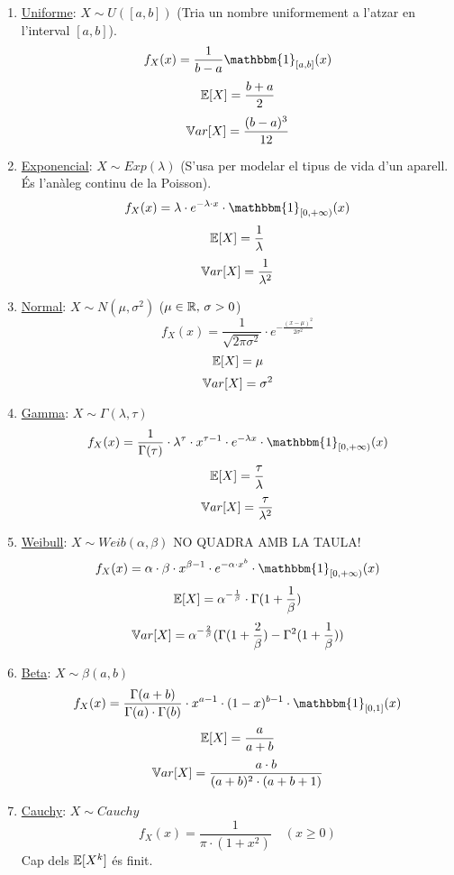 \begin{enumerate}
    \item \underline{Uniforme}: $X \sim U([a,b])$ \quad (Tria un nombre uniformement a l'atzar en l'interval $[a,b]$). \\
    \[
      f_{X}(x)=\frac{1}{b-a}\mathbbm{1}_{[a,b]}(x)
    \]
    \[
      \mathbb{E}[X]=\frac{b+a}{2}
    \]
    \[
      \mathbb{V} ar[X]=\frac{(b-a)^{3}}{12}
    \]
    \item \underline{Exponencial}: $X\sim Exp(\lambda)$ \quad (S'usa per modelar el tipus de vida d'un aparell. És l'anàleg continu de la Poisson).
    \[
      f_{X}(x)=\lambda\cdot e^{-\lambda\cdot x}\cdot \mathbbm{1}_{[0,+\infty)}(x)
    \]
    \[
      \mathbb{E}[X]=\frac{1}{\lambda}
    \]
    \[
      \mathbb{V} ar[X]=\frac{1}{\lambda^{2}}
    \]
    \item \underline{Normal}: $X\sim N(\mu, \sigma^{2})$ \quad ($\mu \in \mathbb{R}, \, \sigma > 0$)
    \[
      f_{X}(x)=\frac{1}{\sqrt{2\pi\sigma^{2}}}\cdot e^{-\frac{(x-\mu)^{2}}{2\sigma^{2}}}
    \]
    \[
      \mathbb{E}[X]=\mu
    \]
    \[
      \mathbb{V} ar[X]=\sigma^{2}
    \]
    \item \underline{Gamma}: $X \sim \Gamma(\lambda, \tau)$
    \[
      f_{X}(x)=\frac{1}{\Gamma(\tau)}\cdot \lambda^{\tau}\cdot x^{\tau -1}\cdot e^{-\lambda x}\cdot \mathbbm{1}_{[0,+\infty)}(x)
    \]
    \[
      \mathbb{E}[X]=\frac{\tau}{\lambda}
    \]
    \[
      \mathbb{V} ar[X]=\frac{\tau}{\lambda^{2}}
    \]
    \item \underline{Weibull}: $X\sim Weib(\alpha, \beta)$ {\Large{NO QUADRA AMB LA TAULA!}}
    \[
      f_{X}(x)=\alpha\cdot \beta \cdot x^{\beta-1}\cdot e^{-\alpha\cdot x^{b}}\cdot \mathbbm{1}_{[0,+\infty)}(x)
    \]
    \[
      \mathbb{E}[X]=\alpha^{-\frac{1}{\beta}}\cdot \Gamma(1+\frac{1}{\beta})
    \]
    \[
      \mathbb{V} ar[X]=\alpha^{-\frac{2}{\beta}}(\Gamma(1+\frac{2}{\beta})-\Gamma^{2}(1+\frac{1}{\beta}))
    \]
    \item \underline{Beta}: $X\sim \beta(a,b)$
    \[
      f_{X}(x)=\frac{\Gamma(a+b)}{\Gamma(a)\cdot \Gamma(b)}\cdot x^{a-1}\cdot (1-x)^{b-1}\cdot \mathbbm{1}_{[0,1]}(x)
    \]
    \[
      \mathbb{E}[X]=\frac{a}{a+b}
    \]
    \[
      \mathbb{V} ar[X]=\frac{a\cdot b}{(a+b)^{2}\cdot (a+b+1)}
    \]
    \item \underline{Cauchy}: $X\sim Cauchy$
    \[
      f_{X}(x)=\frac{1}{\pi\cdot (1+x^{2})} \quad (x \geq 0)
    \]
     \quad Cap dels $\mathbb{E}[X^{k}]$ és finit.
\end{enumerate}
